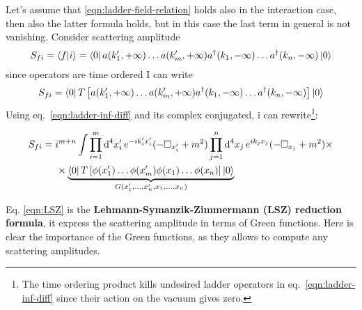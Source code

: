 \documentclass[../main/main.tex]{subfiles}
\begin{document}
Let's assume that \eqref{eqn:ladder-field-relation} holds also in the interaction case, then also the latter formula holds, but in this case the last term in general is not vanishing. 
Consider scattering amplitude
\[S_{fi}=\braket {f}{i}=\bra0a(k_1',+\infty)\dots a(k'_m,+\infty)a^\dagger(k_1,-\infty)\dots a^\dagger(k_n,-\infty)\ket0
\]
since operators are time ordered I can write
\[S_{fi}=\bra0T\left[a(k_1',+\infty)\dots a(k'_m,+\infty)a^\dagger(k_1,-\infty)\dots a^\dagger(k_n,-\infty)\right]\ket0
\]
Using eq.~\eqref{eqn:ladder-inf-diff} and its complex conjugated, i can rewrite\footnote{The time ordering product kills undesired ladder operators in eq.~\eqref{eqn:ladder-inf-diff} since their action on the vacuum gives zero.}:
\begin{mdframed}[style=mybox]
\begin{equation}\label{eqn:LSZ}\begin{split}
S_{fi}
&=i^{m+n}\int
\prod_{i=1}^m\textup{d}^4x'_i\,e^{-ik'_ix'_i}(-\square_{x'_i}+m^2)
\prod_{j=1}^n\textup{d}^4x_j\,e^{ik_jx_j}(-\square_{x_j}+m^2)\times\\
&\hspace{0.5cm}\times
\underbrace{\bra0 T\left[\phi(x'_1)\dots\phi(x'_m)\phi(x_1)\dots\phi(x_n)\right]\ket0}_{G(x'_1,\dots,x'_n,x_1,\dots,x_n)}
\end{split}\end{equation}
\end{mdframed}

Eq. \eqref{eqn:LSZ} is the \textbf{Lehmann-Symanzik-Zimmermann (LSZ) reduction formula}, it express the scattering amplitude in terms of Green functions. Here is clear the importance of the Green functions, as they allows to compute any scattering amplitudes.
\end{document}
